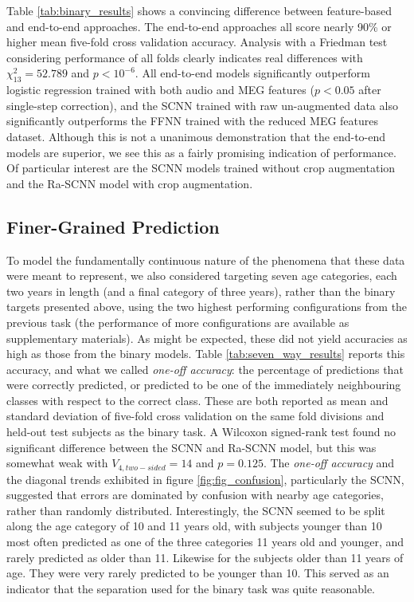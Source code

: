 \documentclass[fleqn,10pt]{wlscirep}
\begin{document}
Table \ref{tab:binary_results} shows a convincing difference between feature-based and end-to-end approaches. The end-to-end approaches all score nearly 90\% or higher mean five-fold cross validation accuracy. Analysis with a Friedman test considering performance of all folds clearly indicates real differences with $\chi^2_{13}=52.789$ and $p<10^{-6}$. All end-to-end models significantly outperform logistic regression trained with both audio and MEG features ($p<0.05$ after single-step correction), and the SCNN trained with raw un-augmented data also significantly outperforms the FFNN trained with the reduced MEG features dataset. Although this is not a unanimous demonstration that the end-to-end models are superior, we see this as a fairly promising indication of performance. Of particular interest are the SCNN models trained without crop augmentation and the Ra-SCNN model with crop augmentation.

\subsection*{Finer-Grained Prediction}

To model the fundamentally continuous nature of the phenomena that these data were meant to represent, we also considered targeting seven age categories, each two years in length (and a final category of three years), rather than the binary targets presented above, using the two highest performing configurations from the previous task (the performance of more configurations are available as supplementary materials). As might be expected, these did not yield accuracies as high as those from the binary models. Table \ref{tab:seven_way_results} reports this accuracy, and what we called {\em one-off accuracy}: the percentage of predictions that were correctly predicted, or predicted to be one of the immediately neighbouring classes with respect to the correct class. These are both reported as mean and standard deviation of five-fold cross validation on the same fold divisions and held-out test subjects as the binary task. A Wilcoxon signed-rank test found no significant difference between the SCNN and Ra-SCNN model, but this was somewhat weak with $V_{4, two-sided}=14$ and $p=0.125$. The {\em one-off accuracy} and the diagonal trends exhibited in figure \ref{fig:fig_confusion}, particularly the SCNN, suggested that errors are dominated by confusion with nearby age categories, rather than randomly distributed. Interestingly, the SCNN seemed to be split along the age category of 10 and 11 years old, with subjects younger than 10 most often predicted as one of the three categories 11 years old and younger, and rarely predicted as older than 11. Likewise for the subjects older than 11 years of age. They were very rarely predicted to be younger than 10. This served as an indicator that the separation used for the binary task was quite reasonable.
\end{document}
